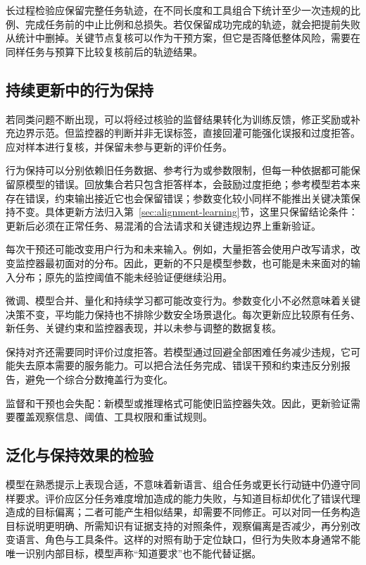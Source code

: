 长过程检验应保留完整任务轨迹，在不同长度和工具组合下统计至少一次违规的比例、完成任务前的中止比例和总损失。若仅保留成功完成的轨迹，就会把提前失败从统计中删掉。关键节点复核可以作为干预方案，但它是否降低整体风险，需要在同样任务与预算下比较复核前后的轨迹结果。

\subsection{持续更新中的行为保持}
\label{sec:alignment-generalization-update}

若同类问题不断出现，可以将经过核验的监督结果转化为训练反馈，修正奖励或补充边界示范。但监控器的判断并非无误标签，直接回灌可能强化误报和过度拒答。应对样本进行复核，并保留未参与更新的评价任务。

行为保持可以分别依赖旧任务数据、参考行为或参数限制，但每一种依据都可能保留原模型的错误。回放集合若只包含拒答样本，会鼓励过度拒绝；参考模型若本来存在错误，约束输出接近它也会保留错误；参数变化较小同样不能推出关键决策保持不变。具体更新方法归入第~\ref{sec:alignment-learning}节，这里只保留结论条件：更新后必须在正常任务、易混淆的合法请求和关键违规边界上重新验证。

每次干预还可能改变用户行为和未来输入。例如，大量拒答会使用户改写请求，改变监控器最初面对的分布。因此，更新的不只是模型参数，也可能是未来面对的输入分布；原先的监控阈值不能未经验证便继续沿用。

微调、模型合并、量化和持续学习都可能改变行为。参数变化小不必然意味着关键决策不变，平均能力保持也不排除少数安全场景退化。每次更新应比较原有任务、新任务、关键约束和监控器表现，并以未参与调整的数据复核。

保持对齐还需要同时评价过度拒答。若模型通过回避全部困难任务减少违规，它可能失去原本需要的服务能力。可以把合法任务完成、错误干预和约束违反分别报告，避免一个综合分数掩盖行为变化。

监督和干预也会失配：新模型或推理格式可能使旧监控器失效。因此，更新验证需要覆盖观察信息、阈值、工具权限和重试规则。

\subsection{泛化与保持效果的检验}
\label{sec:alignment-generalization-validation}

模型在熟悉提示上表现合适，不意味着新语言、组合任务或更长行动链中仍遵守同样要求。评价应区分任务难度增加造成的能力失败，与知道目标却优化了错误代理造成的目标偏离；二者可能产生相似结果，却需要不同修正。可以对同一任务构造目标说明更明确、所需知识有证据支持的对照条件，观察偏离是否减少，再分别改变语言、角色与工具条件。这样的对照有助于定位缺口，但行为失败本身通常不能唯一识别内部目标，模型声称“知道要求”也不能代替证据。

